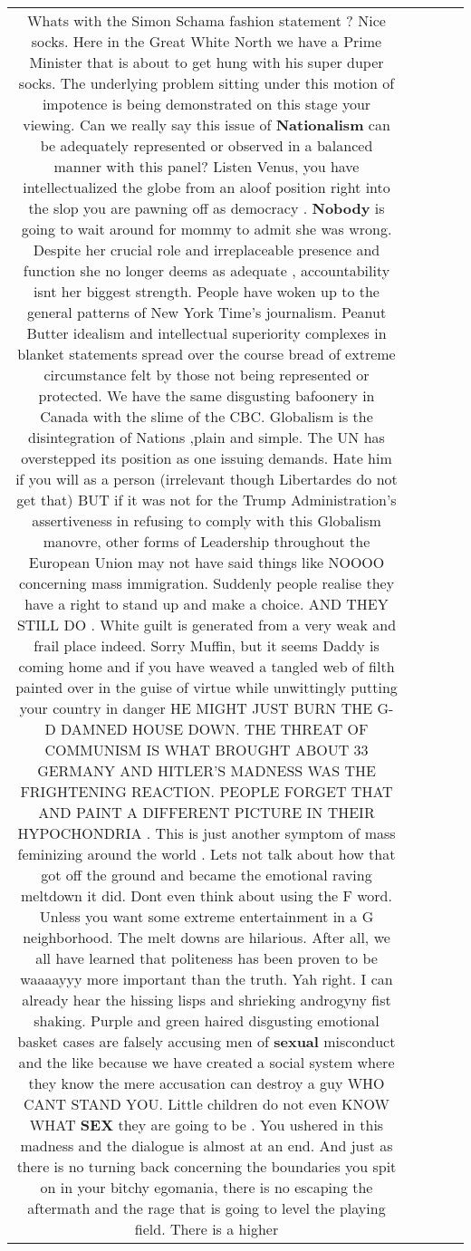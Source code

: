 \documentclass[11pt]{article}
\newlength\mylength
\begin{document}
\begin{center}
\begin{longtable}{|C{.65\mylength}|C{.30\mylength}|C{.12\mylength}|C{.12\mylength}|C{.12\mylength}|}
  \small Whats with the Simon Schama fashion statement ? Nice socks. Here in the Great White North we have a Prime Minister that is about to get hung with his super duper socks. The underlying problem sitting under this motion of impotence is being demonstrated on this stage your viewing. Can we really say this issue of \textbf{Nationalism} can be adequately represented or observed in a balanced manner with this panel? Listen Venus, you have intellectualized the globe from an aloof position right into the slop you are pawning off as democracy . \textbf{Nobody} is going to wait around for mommy to admit she was wrong. Despite her crucial role and irreplaceable presence and function she no longer deems as adequate , accountability isnt her biggest strength. People have woken up to the general patterns of New York Time's journalism. Peanut Butter idealism and intellectual superiority complexes  in blanket statements spread over the course bread of extreme circumstance felt by those not being represented or protected. We have the same disgusting bafoonery in Canada with the slime of the CBC. Globalism is the disintegration of Nations ,plain and simple. The UN has overstepped its position as one issuing demands. Hate him if you will as a person (irrelevant though Libertardes do not get that) BUT if it was not for the Trump Administration's assertiveness in refusing to comply with this Globalism manovre, other forms of Leadership throughout the European Union may not have said things like NOOOO concerning mass immigration. Suddenly people realise they have a right to stand up and make a choice. AND THEY STILL DO . White guilt is generated from a very weak and frail place indeed. Sorry Muffin, but it seems Daddy is coming home and if you have weaved a tangled web of filth painted over in the guise of virtue while unwittingly putting your country in danger HE MIGHT JUST BURN THE G-D DAMNED HOUSE DOWN. THE THREAT OF COMMUNISM IS WHAT BROUGHT ABOUT 33 GERMANY AND HITLER'S MADNESS WAS THE FRIGHTENING REACTION. PEOPLE FORGET THAT AND PAINT A DIFFERENT PICTURE IN THEIR HYPOCHONDRIA . This is just another symptom of mass feminizing around the world . Lets not talk about how that got off the ground and became the emotional raving meltdown it did. Dont even think about using the F word. Unless you want some extreme entertainment in a G neighborhood. The melt downs are hilarious. After all, we all have learned that politeness has been proven to be waaaayyy more important than the truth. Yah right. I can already hear the hissing lisps and shrieking  androgyny fist shaking. Purple and green haired disgusting emotional basket cases are falsely accusing men of \textbf{sexual} misconduct and the like because we have created a social system where they know the mere accusation can destroy a guy WHO CANT STAND YOU.  Little children do not even KNOW WHAT \textbf{SEX} they are going to be . You ushered in this madness and the dialogue is almost at an end. And just as there is no turning back concerning the boundaries you spit on in your bitchy egomania, there is no escaping the aftermath and the rage that is going to level the playing field. There is a higher 
\end{longtable}
\end{center}
\end{document}
